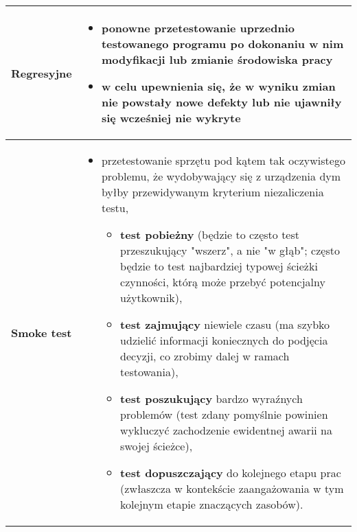 \documentclass[../main.tex]{subfiles}
\begin{document}
    \begin{table}[H]
        \begin{center}
            \begin{tabular}{ p{3cm} p{13cm} }
                    \textbf{Regresyjne}
                    &
                    \begin{itemize}
                        \item ponowne przetestowanie uprzednio testowanego programu po dokonaniu w nim modyfikacji
                        lub zmianie środowiska pracy
                        \item w celu upewnienia
                        się, że w wyniku zmian nie powstały nowe defekty lub nie ujawniły się wcześniej nie wykryte
                    \end{itemize}
                    \\

                    \toprule

                    \textbf{Smoke test}
                    &
                    \begin{itemize}
                        \item przetestowanie sprzętu pod kątem tak oczywistego problemu, że wydobywający się z urządzenia dym
                        byłby przewidywanym kryterium niezaliczenia testu,
                        \begin{itemize}
                            \item \textbf{test pobieżny} (będzie to często test przeszukujący "wszerz", a nie "w głąb"; często będzie to test najbardziej typowej ścieżki czynności, którą może przebyć potencjalny użytkownik),
                            \item \textbf{test zajmujący} niewiele czasu (ma szybko udzielić informacji koniecznych do podjęcia decyzji, co zrobimy dalej w ramach testowania),
                            \item \textbf{test poszukujący} bardzo wyraźnych problemów (test zdany pomyślnie powinien wykluczyć zachodzenie ewidentnej awarii na swojej ścieżce),
                            \item \textbf{test dopuszczający} do kolejnego etapu prac (zwłaszcza w kontekście zaangażowania w tym kolejnym etapie znaczących zasobów).
                        \end{itemize}
                    \end{itemize}
                    \\
            \end{tabular}
        \end{center}
    \end{table}
\end{document}
